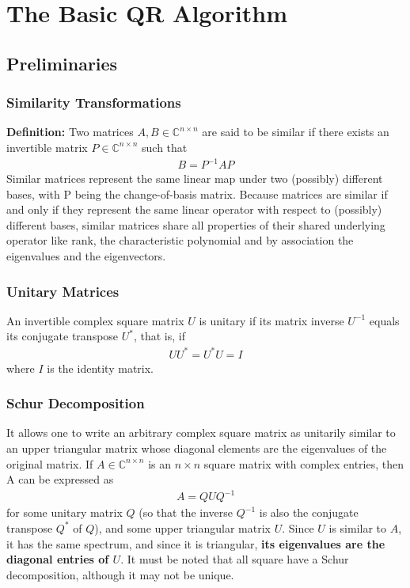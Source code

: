 
\chapter{The Basic QR Algorithm}

\label{Chapter2}


\section{Preliminaries}
\label{Preliminaries}
\subsection{Similarity Transformations}
    \textbf{Definition: } Two matrices $A, B \in \mathbb{C}^{n \times n}$ are said to be similar if there exists an invertible matrix $P \in \mathbb{C}^{n \times n}$ such that
    \begin{align}
        B = P^{-1}AP
    \end{align}
    Similar matrices represent the same linear map under two (possibly) different bases, with P being the change-of-basis matrix. Because matrices are similar if and only if they represent the same linear operator with respect to (possibly) different bases, similar matrices share all properties of their shared underlying operator like rank, 
    the characteristic polynomial and by association the eigenvalues and the eigenvectors.
\subsection{Unitary Matrices}
    An invertible complex square matrix $U$ is unitary if its matrix inverse $U^{-1}$ equals its conjugate transpose $U^*$, that is, if
    \begin{align}
        UU^* = U^*U = I
    \end{align}
    where $I$ is the identity matrix.
\subsection{Schur Decomposition}
    It allows one to write an arbitrary complex square matrix as unitarily similar to an upper triangular matrix whose diagonal elements are the eigenvalues of the original matrix. If $A \in \mathbb{C}^{n \times n}$ is an $n \times n$ square matrix with complex entries, then A can be expressed as
    \begin{align}
        A = QUQ^{-1}
    \end{align}
    for some unitary matrix $Q$ (so that the inverse $Q^{-1}$ is also the conjugate transpose $Q^*$ of $Q$), and some upper triangular matrix $U$. Since $U$ is similar to $A$, it has the same spectrum, and since it is triangular, \textbf{its eigenvalues are the diagonal entries of $U$}. It must be noted that all square have a Schur decomposition, although it may not be unique.

